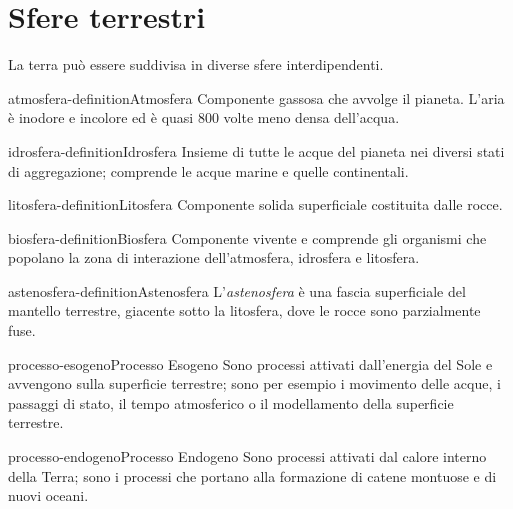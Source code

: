 \documentclass[preview]{standalone}
\begin{document}
\genpage

\section{Sfere terrestri}

\begin{plainhtml}
    La terra può essere suddivisa in diverse sfere interdipendenti.
\end{plainhtml}

\begin{snippetdefinition}{atmosfera-definition}{Atmosfera}
    Componente gassosa che avvolge il pianeta. L'aria è inodore e incolore ed è quasi 800 volte meno densa dell'acqua.
\end{snippetdefinition}

\begin{snippetdefinition}{idrosfera-definition}{Idrosfera}
    Insieme di tutte le acque del pianeta nei diversi stati di aggregazione; comprende le acque marine e quelle continentali.
\end{snippetdefinition}
    
\begin{snippetdefinition}{litosfera-definition}{Litosfera}
    Componente solida superficiale costituita dalle rocce.
\end{snippetdefinition}

\begin{snippetdefinition}{biosfera-definition}{Biosfera}
    Componente vivente e comprende gli organismi che popolano la zona di interazione dell'atmosfera, idrosfera e litosfera.
\end{snippetdefinition}

\begin{snippetdefinition}{astenosfera-definition}{Astenosfera}
    L'\textit{astenosfera} è una fascia superficiale del mantello terrestre, giacente sotto la litosfera,
    dove le rocce sono parzialmente fuse.
\end{snippetdefinition}

\begin{snippetdefinition}{processo-esogeno}{Processo Esogeno}
    Sono processi attivati dall'energia del Sole e avvengono sulla superficie terrestre; sono per esempio i movimento delle acque, i passaggi di stato, il tempo atmosferico o il modellamento della superficie terrestre.
\end{snippetdefinition}

\begin{snippetdefinition}{processo-endogeno}{Processo Endogeno}
    Sono processi attivati dal calore interno della Terra; sono i processi che portano alla formazione di catene montuose e di nuovi oceani.
\end{snippetdefinition}
\end{document}
